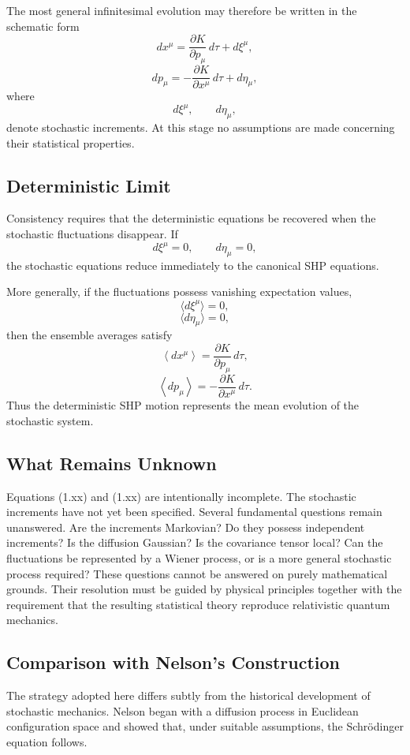 The most general infinitesimal evolution may therefore be written in the
schematic form
\[dx^\mu=\frac{\partial K}{\partial p_\mu}\,d\tau+d\xi^\mu,\]
\[dp_\mu=-\frac{\partial K}{\partial x^\mu}\,d\tau+d\eta_\mu,\]
where
\[d\xi^\mu,\qquad d\eta_\mu,\]
denote stochastic increments.
At this stage no assumptions are made concerning their statistical
properties.
\subsection{Deterministic Limit}
Consistency requires that the deterministic equations be recovered when
the stochastic fluctuations disappear.
If
\[d\xi^\mu=0,\qquad d\eta_\mu=0,\]
the stochastic equations reduce immediately to the canonical SHP
equations.

More generally, if the fluctuations possess vanishing expectation
values,
\[\langle d\xi^\mu\rangle =0,\]
\[\langle d\eta_\mu\rangle =0,\]
then the ensemble averages satisfy
\[\left\langle dx^\mu\right\rangle=\frac{\partial K}{\partial p_\mu}\,d\tau,\]
\[\left\langle dp_\mu\right\rangle=-\frac{\partial K}{\partial x^\mu}\,d\tau.\]
Thus the deterministic SHP motion represents the mean evolution of the
stochastic system.
\subsection{What Remains Unknown}
Equations (1.xx) and (1.xx) are intentionally incomplete.
The stochastic increments have not yet been specified.
Several fundamental questions remain unanswered.
Are the increments Markovian?
Do they possess independent increments?
Is the diffusion Gaussian?
Is the covariance tensor local?
Can the fluctuations be represented by a Wiener process, or is a more
general stochastic process required?
These questions cannot be answered on purely mathematical grounds.
Their resolution must be guided by physical principles together with the
requirement that the resulting statistical theory reproduce relativistic
quantum mechanics.
\subsection{Comparison with Nelson's Construction}
The strategy adopted here differs subtly from the historical
development of stochastic mechanics.
Nelson began with a diffusion process in Euclidean configuration space
and showed that, under suitable assumptions, the Schrödinger equation
follows.

